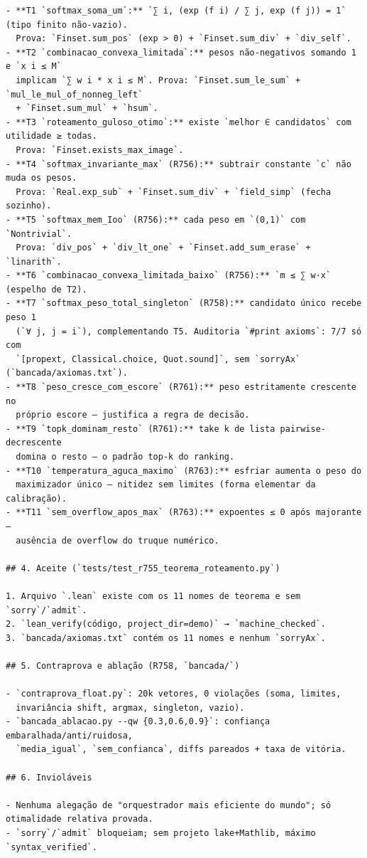 \documentclass[12pt,openany,oneside,a4paper,brazil,chapter=TITLE]{abntex2}
\begin{document}
\begin{lstlisting}
- **T1 `softmax_soma_um`:** `∑ i, (exp (f i) / ∑ j, exp (f j)) = 1` (tipo finito não-vazio).
  Prova: `Finset.sum_pos` (exp > 0) + `Finset.sum_div` + `div_self`.
- **T2 `combinacao_convexa_limitada`:** pesos não-negativos somando 1 e `x i ≤ M`
  implicam `∑ w i * x i ≤ M`. Prova: `Finset.sum_le_sum` + `mul_le_mul_of_nonneg_left`
  + `Finset.sum_mul` + `hsum`.
- **T3 `roteamento_guloso_otimo`:** existe `melhor ∈ candidatos` com utilidade ≥ todas.
  Prova: `Finset.exists_max_image`.
- **T4 `softmax_invariante_max` (R756):** subtrair constante `c` não muda os pesos.
  Prova: `Real.exp_sub` + `Finset.sum_div` + `field_simp` (fecha sozinho).
- **T5 `softmax_mem_Ioo` (R756):** cada peso em `(0,1)` com `Nontrivial`.
  Prova: `div_pos` + `div_lt_one` + `Finset.add_sum_erase` + `linarith`.
- **T6 `combinacao_convexa_limitada_baixo` (R756):** `m ≤ ∑ w·x` (espelho de T2).
- **T7 `softmax_peso_total_singleton` (R758):** candidato único recebe peso 1
  (`∀ j, j = i`), complementando T5. Auditoria `#print axioms`: 7/7 só com
  `[propext, Classical.choice, Quot.sound]`, sem `sorryAx` (`bancada/axiomas.txt`).
- **T8 `peso_cresce_com_escore` (R761):** peso estritamente crescente no
  próprio escore — justifica a regra de decisão.
- **T9 `topk_dominam_resto` (R761):** take k de lista pairwise-decrescente
  domina o resto — o padrão top-k do ranking.
- **T10 `temperatura_aguca_maximo` (R763):** esfriar aumenta o peso do
  maximizador único — nitidez sem limites (forma elementar da calibração).
- **T11 `sem_overflow_apos_max` (R763):** expoentes ≤ 0 após majorante —
  ausência de overflow do truque numérico.

## 4. Aceite (`tests/test_r755_teorema_roteamento.py`)

1. Arquivo `.lean` existe com os 11 nomes de teorema e sem `sorry`/`admit`.
2. `lean_verify(código, project_dir=demo)` → `machine_checked`.
3. `bancada/axiomas.txt` contém os 11 nomes e nenhum `sorryAx`.

## 5. Contraprova e ablação (R758, `bancada/`)

- `contraprova_float.py`: 20k vetores, 0 violações (soma, limites,
  invariância shift, argmax, singleton, vazio).
- `bancada_ablacao.py --qw {0.3,0.6,0.9}`: confiança embaralhada/anti/ruidosa,
  `media_igual`, `sem_confianca`, diffs pareados + taxa de vitória.

## 6. Invioláveis

- Nenhuma alegação de "orquestrador mais eficiente do mundo"; só otimalidade relativa provada.
- `sorry`/`admit` bloqueiam; sem projeto lake+Mathlib, máximo `syntax_verified`.
\end{lstlisting}
\end{document}
